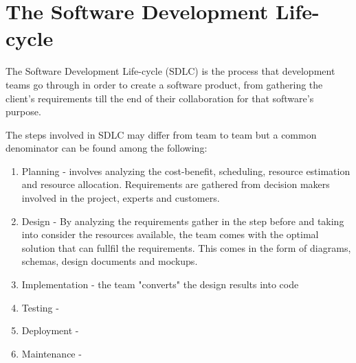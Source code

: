 \section{The Software Development Life-cycle}

\par The Software Development Life-cycle (SDLC) is the process that development teams go through in order to create a software product, from gathering the client's requirements till the end of their collaboration for that software's purpose.

The steps involved in SDLC may differ from team to team but a common denominator can be found among the following:

\begin{enumerate}
    \item Planning - involves analyzing the cost-benefit, scheduling, resource estimation and resource allocation. Requirements are gathered from decision makers involved in the project, experts and customers.
    \item Design - By analyzing the requirements gather in the step before and taking into consider the resources available, the team comes with the optimal solution that can fullfil the requirements. This comes in the form of diagrams, schemas, design documents and mockups.
    \item Implementation - the team "converts" the design results into code
    \item Testing - 
    \item Deployment - 
    \item Maintenance - 
\end{enumerate}
